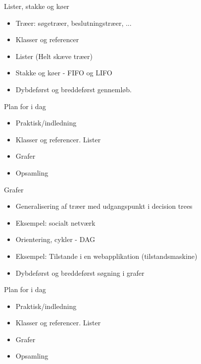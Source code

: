 \documentclass[a4paper,landscape]{slides}
\begin{document}
\begin{slide}
	\begin{center} {\large 
      Lister, stakke og køer
	} \end{center}
	\begin{itemize} \addtolength{\itemsep}{-\baselineskip}
      \item     Træer: søgetræer, beslutningstræer, ...
      \item     Klasser og referencer
      \item     Lister (Helt skæve træer)
      \item     Stakke og køer - FIFO og LIFO 
      \item     Dybdeførst og breddeførst gennemløb.
	\end{itemize}
\end{slide}



\begin{slide}
	\begin{center} {\large 
            Plan for i dag
	} \end{center}
	\begin{itemize} \addtolength{\itemsep}{-\baselineskip}
            \item Praktisk/indledning
            \item Klasser og referencer. Lister
            \item Grafer
            \item Opsamling 
	\end{itemize}
\end{slide}

\begin{slide}
	\begin{center} {\large 
      Grafer
	} \end{center}
	\begin{itemize} \addtolength{\itemsep}{-\baselineskip}
      \item     Generalisering af træer med udgangspunkt i decision trees
      \item     Eksempel: socialt netværk
      \item     Orientering, cykler - DAG
      \item     Eksempel: Tilstande i en webapplikation (tilstandsmaskine)
      \item     Dybdeførst og breddeførst søgning i grafer
	\end{itemize}
\end{slide}


\begin{slide}
	\begin{center} {\large 
            Plan for i dag
	} \end{center}
	\begin{itemize} \addtolength{\itemsep}{-\baselineskip}
            \item Praktisk/indledning
            \item Klasser og referencer. Lister
            \item Grafer
            \item Opsamling 
	\end{itemize}
\end{slide}
\end{document}
